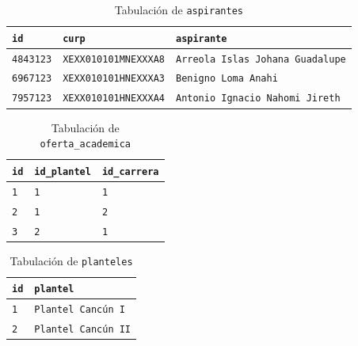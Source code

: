 \documentclass[12pt]{article}
\begin{document}
\begin{table}[h!]
	\begin{center}
		\begin{tabular}{p{3cm}|p{4.836666667cm}|l}
			\hline
			\textbf{\texttt{id}} & \textbf{\texttt{curp}} & \textbf{\texttt{aspirante}} \\
			\hline
			\texttt{4843123} & \texttt{XEXX010101MNEXXXA8} & \texttt{Arreola Islas Johana Guadalupe} \\
			\texttt{6967123} & \texttt{XEXX010101HNEXXXA3} & \texttt{Benigno Loma Anahi} \\
			\texttt{7957123} & \texttt{XEXX010101HNEXXXA4} & \texttt{Antonio Ignacio Nahomi Jireth} \\
			\hline
		\end{tabular}
		\caption{Tabulación de \texttt{aspirantes}}
		\label{tab:aspirantes}
	\end{center}
\end{table}

\begin{table}[h!]
	\begin{center}
		\begin{tabular}{p{4cm}|p{4cm}|p{6.51cm}}
			\hline
			\textbf{\texttt{id}} & \textbf{\texttt{id\_plantel}} & \textbf{\texttt{id\_carrera}} \\
			\hline
			\texttt{1} & \texttt{1} & \texttt{1} \\
			\texttt{2} & \texttt{1} & \texttt{2} \\
			\texttt{3} & \texttt{2} & \texttt{1} \\
			\hline
		\end{tabular}
		\caption{Tabulación de \texttt{oferta\_academica}}
		\label{tab:oferta-academica}
	\end{center}
\end{table}

\begin{table}[h!]
	\begin{center}
		\begin{tabular}{p{7.255cm}|p{7.255cm}}
			\hline
			\textbf{\texttt{id}} & \textbf{\texttt{plantel}} \\
			\hline
			\texttt{1} & \texttt{Plantel Cancún I} \\
			\texttt{2} & \texttt{Plantel Cancún II} \\
			\hline
		\end{tabular}
		\caption{Tabulación de \texttt{planteles}}
		\label{tab:planteles}
	\end{center}
\end{table}
\end{document}
